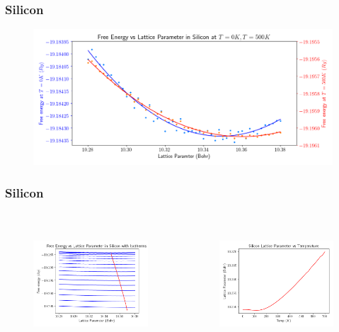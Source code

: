 \documentclass{beamer}
\begin{document}
\begin{frame}
	\frametitle{Silicon}
	\begin{figure}[ht]
	\begin{center}
	\includegraphics[height=2in]{silicon_0_500_comparison.png}
	\end{center}
	\end{figure}
\end{frame}

\begin{frame}
	\frametitle{Silicon}
	\begin{columns}
	\begin{figure}[ht]
	\begin{center}
	\includegraphics[height=1.8in]{silicon_isotherms.png}
	\end{center}
	\end{figure}
	\begin{figure}[ht]
	\begin{center}
	\includegraphics[height=1.8in]{silicon_min_volume.png}
	\end{center}
	\end{figure}
\end{columns}
\end{frame}
\end{document}

